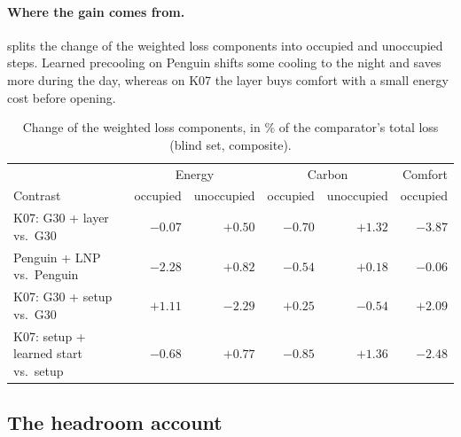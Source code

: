 \paragraph{Where the gain comes from.}  splits the change of the weighted loss components into occupied
and unoccupied steps.
Learned precooling on Penguin shifts some cooling to the night and saves more during the day, whereas on K07 the layer
buys comfort with a small energy cost before opening.
\begin{table}[!htbp]
\centering
\caption{Change of the weighted loss components, in \% of the comparator's total loss (blind set, composite).}
\label{tab:occ}
\small
\begin{tabular}{lrrrrr}
\toprule
& \multicolumn{2}{c}{Energy} & \multicolumn{2}{c}{Carbon} & Comfort\\
Contrast & occupied & unoccupied & occupied & unoccupied & occupied\\
\midrule
K07: G30 + layer vs.\ G30 & $-0.07$ & $+0.50$ & $-0.70$ & $+1.32$ & $-3.87$\\
Penguin + LNP vs.\ Penguin & $-2.28$ & $+0.82$ & $-0.54$ & $+0.18$ & $-0.06$\\
K07: G30 + setup vs.\ G30 & $+1.11$ & $-2.29$ & $+0.25$ & $-0.54$ & $+2.09$\\
K07: setup + learned start vs.\ setup & $-0.68$ & $+0.77$ & $-0.85$ & $+1.36$ & $-2.48$\\
\bottomrule
\end{tabular}
\end{table}

\subsection{The headroom account}\label{app:j-headroom}
